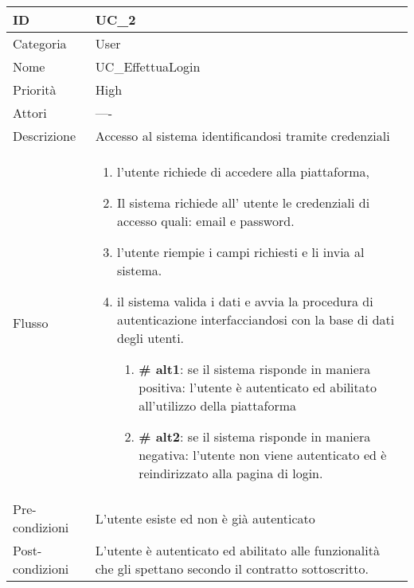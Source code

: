 \begin{center}
\begin{tabular}{ |p{2cm}|p{13cm}|  }
\hline
ID & UC\_2 \\\hline
Categoria & User \\\hline
Nome & UC\_EffettuaLogin \\\hline
Priorità & High \\\hline
Attori &  ---- \\\hline
Descrizione & Accesso al sistema identificandosi tramite credenziali \\\hline
Flusso &  	\begin{enumerate}
			\item l'utente richiede di accedere alla piattaforma,
			\item Il sistema richiede all' utente le credenziali di accesso quali: email e password.
			\item l'utente riempie i campi richiesti e li invia al sistema.
			\item il sistema valida i dati e avvia la procedura di autenticazione interfacciandosi con la base di dati degli utenti.
			\begin{enumerate}[  ]
				\item \textbf{\# alt1}: se il sistema risponde in maniera positiva: l'utente è autenticato ed abilitato all'utilizzo della piattaforma 
				\item \textbf{\# alt2}: se il sistema risponde in maniera negativa: l'utente non viene autenticato ed è reindirizzato alla pagina di login.
			\end{enumerate}
		\end{enumerate}\\\hline
Pre-condizioni &  L'utente esiste ed non è già autenticato\\\hline
Post-condizioni &  L'utente è autenticato ed abilitato alle funzionalità che gli spettano secondo il contratto sottoscritto.\\\hline
\end{tabular}
\label{table_use_case:2}\newline


\end{center}
